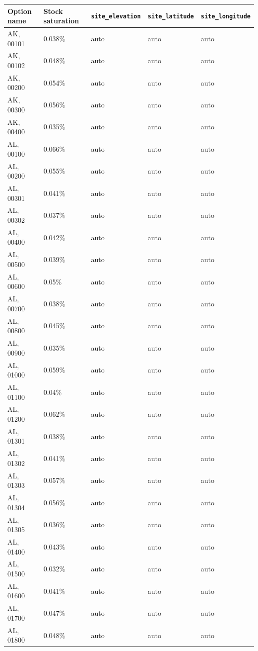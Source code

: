 \begin{longtable}[]{@{}lllll@{}}
\toprule\noalign{}
Option name & Stock saturation & \texttt{site\_elevation} &
\texttt{site\_latitude} & \texttt{site\_longitude} \\
\midrule\noalign{}
\endhead
\bottomrule\noalign{}
\endlastfoot
AK, 00101 & 0.038\% & auto & auto & auto \\
AK, 00102 & 0.048\% & auto & auto & auto \\
AK, 00200 & 0.054\% & auto & auto & auto \\
AK, 00300 & 0.056\% & auto & auto & auto \\
AK, 00400 & 0.035\% & auto & auto & auto \\
AL, 00100 & 0.066\% & auto & auto & auto \\
AL, 00200 & 0.055\% & auto & auto & auto \\
AL, 00301 & 0.041\% & auto & auto & auto \\
AL, 00302 & 0.037\% & auto & auto & auto \\
AL, 00400 & 0.042\% & auto & auto & auto \\
AL, 00500 & 0.039\% & auto & auto & auto \\
AL, 00600 & 0.05\% & auto & auto & auto \\
AL, 00700 & 0.038\% & auto & auto & auto \\
AL, 00800 & 0.045\% & auto & auto & auto \\
AL, 00900 & 0.035\% & auto & auto & auto \\
AL, 01000 & 0.059\% & auto & auto & auto \\
AL, 01100 & 0.04\% & auto & auto & auto \\
AL, 01200 & 0.062\% & auto & auto & auto \\
AL, 01301 & 0.038\% & auto & auto & auto \\
AL, 01302 & 0.041\% & auto & auto & auto \\
AL, 01303 & 0.057\% & auto & auto & auto \\
AL, 01304 & 0.056\% & auto & auto & auto \\
AL, 01305 & 0.036\% & auto & auto & auto \\
AL, 01400 & 0.043\% & auto & auto & auto \\
AL, 01500 & 0.032\% & auto & auto & auto \\
AL, 01600 & 0.041\% & auto & auto & auto \\
AL, 01700 & 0.047\% & auto & auto & auto \\
AL, 01800 & 0.048\% & auto & auto & auto \\

\end{longtable}
